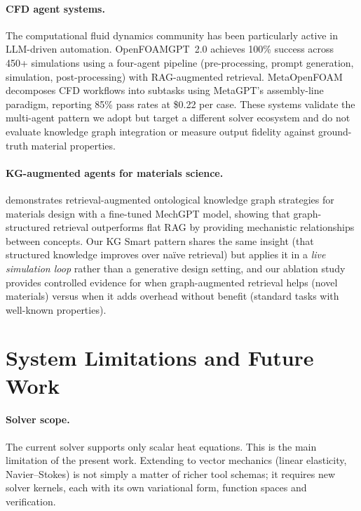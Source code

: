 \documentclass[twocolumn]{article}
\newif\ifrevisionsvisible
\newcommand{\revised}[1]{%
  \ifrevisionsvisible\textcolor{revisionred}{#1}\else#1\fi}
\begin{document}
\paragraph{CFD agent systems.}
The computational fluid dynamics community has been particularly active
in LLM-driven automation.  OpenFOAMGPT~2.0 \citep{chen2025openfoamgpt2}
achieves 100\% success across 450+ simulations using a four-agent
pipeline (pre-processing, prompt generation, simulation, post-processing)
with RAG-augmented retrieval.
MetaOpenFOAM \citep{chen2024metaopenfoam} decomposes CFD workflows into
subtasks using MetaGPT's \citep{hong2024metagpt} assembly-line paradigm,
reporting 85\% pass
rates at \$0.22 per case.
These systems validate the multi-agent pattern we adopt but target a
different solver ecosystem and do not evaluate knowledge graph
integration or measure output fidelity against ground-truth material
properties.

\paragraph{KG-augmented agents for materials science.}
\citet{buehler2024mechgpt} demonstrates retrieval-augmented ontological
knowledge graph strategies for materials design with a fine-tuned
MechGPT model, showing that graph-structured retrieval
outperforms flat RAG by providing mechanistic relationships between
concepts.  Our KG Smart pattern shares the same insight (that structured
knowledge improves over na\"ive retrieval) but applies it in a
\emph{live simulation loop} rather than a generative design setting,
and our ablation study provides controlled evidence for when
graph-augmented retrieval helps (novel materials) versus when it adds
overhead without benefit (standard tasks with well-known properties).

\section{System Limitations and Future Work}
\label{sec:limitations}

\paragraph{Solver scope.}
The current solver supports only scalar heat equations.  \revised{This is the main limitation of the present work.  Extending to
vector mechanics (linear elasticity, Navier--Stokes) is not simply a
matter of richer tool schemas; it requires new solver kernels, each with
its own variational form, function spaces and verification.}
\end{document}
